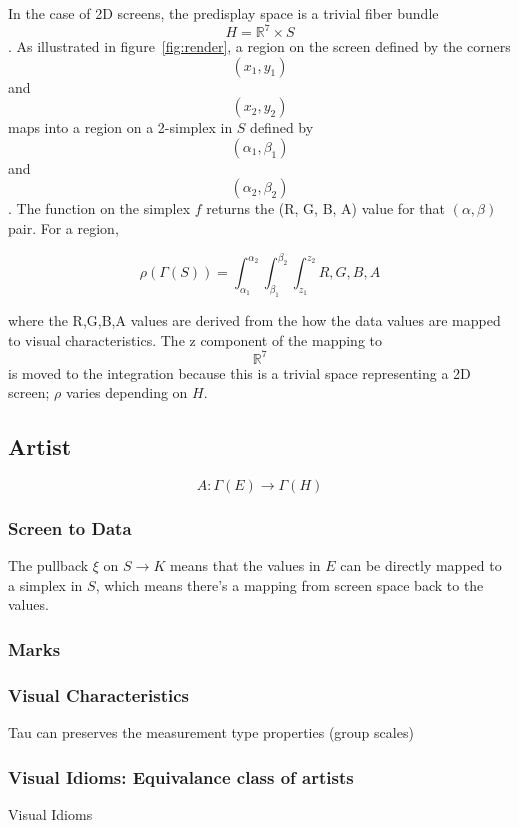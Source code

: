 \documentclass[../intro.tex]{subfiles}
\begin{document}
In the case of 2D screens, the predisplay space is a trivial fiber bundle $$H=\mathbb{R}^{7}\times S$$. As illustrated in figure~\ref{fig:render}, a region on the screen defined by the corners $$(x_1, y_1)$$ and $$(x_2, y_2)$$ maps into a region on a 2-simplex in $S$ defined by $$(\alpha_1, \beta_1)$$ and $$(\alpha_2, \beta_2)$$. The function on the simplex $f$ returns the (R, G, B, A) value for that $(\alpha, \beta)$ pair. For a region, 

\begin{equation*}
\rho(\Gamma(S)) = \int_{\alpha_1}^{\alpha_2}\int_{\beta_1}^{\beta_2}\int_{z_1}^{z_2}{R, G, B, A}  
\end{equation*}

where the R,G,B,A values are derived from the how the data values are mapped to visual characteristics. The z component of the mapping to $$\mathbb{R}^7$$ is moved to the integration because this is a trivial space representing a 2D screen; $\rho$ varies depending on $H$. 


\subsection{Artist}
\begin{equation}
    A: \Gamma(E) \rightarrow \Gamma(H)
\end{equation}

\subsubsection{Screen to Data}

The pullback $\xi$ on $S \rightarrow K$ means that the values in $E$ can be directly mapped to a simplex in $S$, which means there's a mapping from screen space back to the values. 



\subsubsection{Marks}

\subsubsection{Visual Characteristics}
Tau can preserves the measurement type properties (group scales)


\subsubsection{Visual Idioms: Equivalance class of artists}
Visual Idioms
\end{document}
